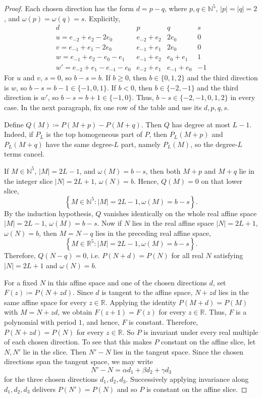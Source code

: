 \documentclass[11pt]{amsart}
\theoremstyle{plain}
\theoremstyle{definition}
\theoremstyle{remark}
\numberwithin{equation}{section}
\newcommand{\R}{\mathbb R}
\newcommand{\N}{\mathbb N}
\newcommand{\1}{\mathbf 1}
\begin{document}
\begin{proof}
Each chosen direction has the form \(d=p-q\), where \(p,q\in\mathbb N^5\), \(|p|=|q|=2\), and \(\omega(p)=\omega(q)=s\). Explicitly,
\[
\begin{array}{c|c|c|c}
d&p&q&s\\
\hline
u=e_{-2}+e_2-2e_0&e_{-2}+e_2&2e_0&0\\
v=e_{-1}+e_1-2e_0&e_{-1}+e_1&2e_0&0\\
w=e_{-1}+e_2-e_0-e_1&e_{-1}+e_2&e_0+e_1&1\\
w'=e_{-2}+e_1-e_{-1}-e_0&e_{-2}+e_1&e_{-1}+e_0&-1
\end{array}
\]
For \(u\) and \(v\), \(s=0\), so \(b-s=b\). If \(b\ge0\), then \(b\in\{0,1,2\}\) and the third direction is \(w\), so \(b-s=b-1\in\{-1,0,1\}\). If \(b<0\), then \(b\in\{-2,-1\}\) and the third direction is \(w'\), so \(b-s=b+1\in\{-1,0\}\). Thus, \(b-s\in\{-2,-1,0,1,2\}\) in every case. In the next paragraph, fix one row of the table and use its \(d,p,q,s\).

Define \(Q\left(M\right)\coloneqq P\left(M+p\right)-P\left(M+q\right)\). Then \(Q\) has degree at most \(L-1\). Indeed, if \(P_L\) is the top homogeneous part of \(P\), then \(P_L\left(M+p\right)\) and \(P_L\left(M+q\right)\) have the same degree-\(L\) part, namely \(P_L\left(M\right)\), so the degree-\(L\) terms cancel.

If \(M\in\N^5\), \(\lvert M\rvert=2L-1\), and \(\omega\left(M\right)=b-s\), then both \(M+p\) and \(M+q\) lie in the integer slice \(\lvert N\rvert=2L+1\), \(\omega\left(N\right)=b\). Hence, \(Q\left(M\right)=0\) on that lower slice,
\[\left\{M\in\N^5\colon\lvert M\rvert=2L-1,\omega\left(M\right)=b-s\right\}.\]
By the induction hypothesis, \(Q\) vanishes identically on the whole real affine space \(\lvert M\rvert=2L-1\), \(\omega\left(M\right)=b-s\). Now if \(N\) lies in the real affine space \(\lvert N\rvert=2L+1\), \(\omega\left(N\right)=b\), then \(M=N-q\) lies in the preceding real affine space, 
\[\left\{M\in\R^5\colon\lvert M\rvert=2L-1,\omega\left(M\right)=b-s\right\}.\] Therefore, \(Q\left(N-q\right)=0\), i.e. \(P\left(N+d\right)=P\left(N\right)\) for all real \(N\) satisfying \(\lvert N\rvert=2L+1\) and \(\omega\left(N\right)=b\).

For a fixed \(N\) in this affine space and one of the chosen directions \(d\), set \(F\left(z\right)\coloneqq P\left(N+zd\right)\). Since \(d\) is tangent to the affine space, \(N+zd\) lies in the same affine space for every \(z\in\R\). Applying the identity \(P\left(M+d\right)=P\left(M\right)\) with \(M=N+zd\), we obtain \(F\left(z+1\right)=F\left(z\right)\) for every \(z\in\R\). Thus, \(F\) is a polynomial with period \(1\), and hence, \(F\) is constant. Therefore, \(P\left(N+zd\right)=P\left(N\right)\) for every \(z\in\R\). So \(P\) is invariant under every real multiple of each chosen direction. To see that this makes \(P\) constant on the affine slice, let \(N,N'\) lie in the slice. Then \(N'-N\) lies in the tangent space. Since the chosen directions span the tangent space, we may write
\[
N'-N=\alpha d_1+\beta d_2+\gamma d_3
\]
for the three chosen directions \(d_1,d_2,d_3\). Successively applying invariance along \(d_1,d_2,d_3\) delivers \(P(N')=P(N)\) and so \(P\) is constant on the affine slice.


\end{proof}
\end{document}
